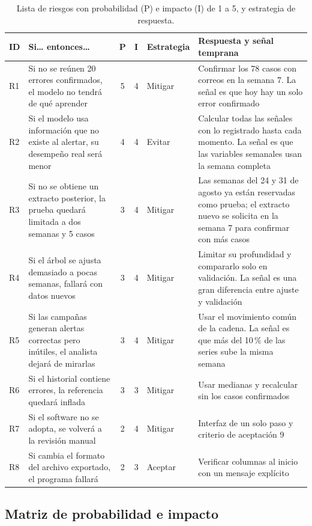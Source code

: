 \begin{table}[htbp]
\centering
\caption{Lista de riesgos con probabilidad (P) e impacto (I) de 1 a 5, y estrategia de respuesta.}
\label{tab:riesgos}
\footnotesize
\begin{tabularx}{\textwidth}{@{}lL{4.2cm}ccL{2.1cm}Y@{}}
\toprule
\textbf{ID} & \textbf{Si\ldots{} entonces\ldots} & \textbf{P} & \textbf{I} & \textbf{Estrategia} & \textbf{Respuesta y señal temprana} \\
\midrule
R1 & Si no se reúnen 20 errores confirmados, el modelo no tendrá de qué aprender & 5 & 4 & Mitigar & Confirmar los 78 casos con correos en la semana 7. La señal es que hoy hay un solo error confirmado \\
R2 & Si el modelo usa información que no existe al alertar, su desempeño real será menor & 4 & 4 & Evitar & Calcular todas las señales con lo registrado hasta cada momento. La señal es que las variables semanales usan la semana completa \\
R3 & Si no se obtiene un extracto posterior, la prueba quedará limitada a dos semanas y 5 casos & 3 & 4 & Mitigar & Las semanas del 24 y 31 de agosto ya están reservadas como prueba; el extracto nuevo se solicita en la semana 7 para confirmar con más casos \\
R4 & Si el árbol se ajusta demasiado a pocas semanas, fallará con datos nuevos & 3 & 4 & Mitigar & Limitar su profundidad y compararlo solo en validación. La señal es una gran diferencia entre ajuste y validación \\
R5 & Si las campañas generan alertas correctas pero inútiles, el analista dejará de mirarlas & 3 & 4 & Mitigar & Usar el movimiento común de la cadena. La señal es que más del 10\,\% de las series sube la misma semana \\
R6 & Si el historial contiene errores, la referencia quedará inflada & 3 & 3 & Mitigar & Usar medianas y recalcular sin los casos confirmados \\
R7 & Si el software no se adopta, se volverá a la revisión manual & 2 & 4 & Mitigar & Interfaz de un solo paso y criterio de aceptación 9 \\
R8 & Si cambia el formato del archivo exportado, el programa fallará & 2 & 3 & Aceptar & Verificar columnas al inicio con un mensaje explícito \\
\bottomrule
\end{tabularx}
\end{table}

\subsection{Matriz de probabilidad e impacto}

